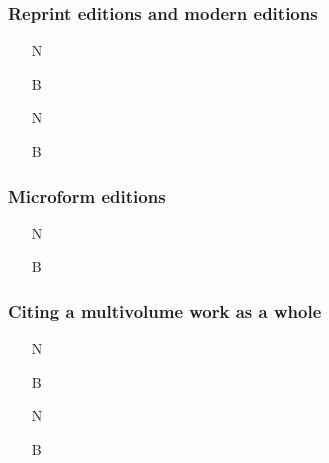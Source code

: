 \documentclass[11pt,letterpaper,oneside]{article}
\begin{document}
\subsubsection{Reprint editions and modern editions}


\begin{itemize}


\item[N] 

\item[B] 

\item[N] 

\item[B] 
\end{itemize}

\subsubsection{Microform editions}
\label{14.120}


\begin{itemize}
\item[N] 

\item[B] 
\end{itemize}

\setcounter{subsubsection}{121}
\subsubsection{Citing a multivolume work as a whole}
\label{14.122}

\begin{itemize}
\item[N] 

\item[B] 

\item[N] 

\item[B] 
\end{itemize}
\end{document}
